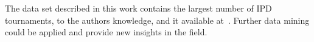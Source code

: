 The data set described in this work contains the largest number of IPD tournaments,
to the authors knowledge, and it available at~\cite{Glynatsi_2019_metatournament}. Further data mining
could be applied and provide new insights in the field.


